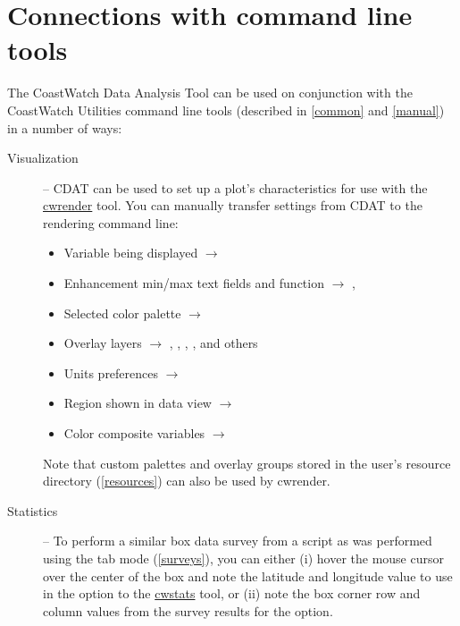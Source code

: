 \section{Connections with command line tools}

The CoastWatch Data Analysis Tool can be used on conjunction with
the CoastWatch Utilities command line tools (described in
\autoref{common} and \autoref{manual}) in a number of ways:
\begin{description}

\item[Visualization] -- CDAT can be used to set up a plot's
characteristics for use with the \hyperlink{cwrender}{cwrender}
tool.  You can manually transfer settings from CDAT to the
rendering command line:
\begin{itemize}

  \item Variable being displayed $\rightarrow$ 

  \item Enhancement min/max text fields and function
  $\rightarrow$ , 

  \item Selected color palette $\rightarrow$ 

  \item Overlay layers $\rightarrow$ ,
  , , ,
   and others

  \item Units preferences  $\rightarrow$ 

  \item Region shown in data view $\rightarrow$ 

  \item Color composite variables $\rightarrow$

\end{itemize}
Note that custom palettes and overlay groups stored in the user's
resource directory (\autoref{resources}) can also be used by
cwrender.

\item[Statistics] -- To perform a similar box data survey from a
script as was performed using the  tab  mode
(\autoref{surveys}), you can either (i) hover the mouse cursor
over the center of the box and note the latitude and longitude
value to use in the  option to the
\hyperlink{cwstats}{cwstats} tool, or (ii) note the box corner
row and column values from the survey results for the
 option.


\end{description}

